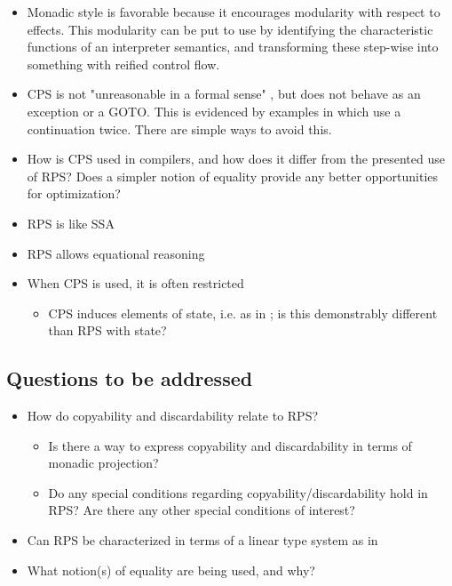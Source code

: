 \documentclass{article}
\begin{document}
\begin{itemize}

\item{Monadic style is favorable because it encourages modularity with respect to effects.  This modularity can be put to use by identifying the characteristic functions of an interpreter semantics, and transforming these step-wise into something with reified control flow.}

\item{CPS is not "unreasonable in a formal sense" \cite{Thielecke_1999}, but does not behave as an exception or a GOTO.  This is evidenced by examples in which use a continuation twice.  There are simple ways to avoid this.}

\item{How is CPS used in compilers, and how does it differ from the presented use of RPS?  Does a simpler notion of equality provide any better opportunities for optimization?}

\item{RPS is like SSA \cite{Appel_1998}}

\item{RPS allows equational reasoning}

\item{When CPS is used, it is often restricted}

	\begin{itemize}
	\item{CPS induces elements of state, i.e. as in \cite{Thielecke_1999}; is this demonstrably different than RPS with state?}
	\end{itemize}

\end{itemize}

\subsection{Questions to be addressed}

\begin{itemize}

\item{How do copyability and discardability \cite{Thielecke_1999} relate to RPS?}

	\begin{itemize}
	
	\item{Is there a way to express copyability and discardability in terms of monadic projection?}
	
	\item{Do any special conditions regarding copyability/discardability hold in RPS?  Are there any other special conditions of interest?}
	
	\end{itemize}


\item{Can RPS be characterized in terms of a linear type system as in \cite{Berdine_etal_2001}}

\item{What notion(s) of equality are being used, and why?}

\end{itemize}
\end{document}
